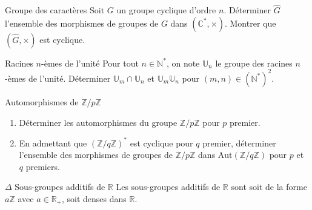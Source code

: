 \documentclass[french,a4paper]{article}
\newcommand{\N}{\mathbb{N}}
\newcommand{\Z}{\mathbb{Z}}
\newcommand{\R}{\mathbb{R}}
\newcommand{\C}{\mathbb{C}}
\newcommand{\U}{\mathbb{U}}
\newcommand{\st}{^*}
\theoremstyle{plain}
\theoremstyle{definition}
\theoremstyle{remark}
\begin{document}
\begin{ex}[Moulin.AG.06]{Groupe des caractères}
	Soit $G$ un groupe cyclique d'ordre $n$. Déterminer $\hat{G}$ l'ensemble des morphismes de groupes de $G$ dans $(\C\st,\times)$. Montrer que $(\hat{G},\times)$ est cyclique.
\end{ex}

\begin{ex}[Moulin.AG.07]{Racines $n$-èmes de l'unité}
	Pour tout $n\in\N\st$, on note $\U_n$ le groupe des racines $n$-èmes de l'unité. Déterminer $\U_m\cap\U_n$ et $\U_m\U_n$ pour $(m,n)\in(\N\st)^2$.
\end{ex}

\begin{ex}[Moulin.AG.08]{Automorphismes de $\Z/p\Z$}
	\begin{enumerate}
		\item Déterminer les automorphismes du groupe $\Z/p\Z$ pour $p$ premier.
		\item En admettant que $(\Z/q\Z)\st$ est cyclique pour $q$ premier, déterminer l'ensemble des morphismes de groupes de $\Z/p\Z$ dans $\text{Aut}(\Z/q\Z)$ pour $p$ et $q$ premiers.
	\end{enumerate}
\end{ex}

\begin{ex}[Moulin.AG.09]{$\Delta$ Sous-groupes additifs de $\R$}
	Les sous-groupes additifs de $\R$ sont soit de la forme $a\Z$ avec $a\in\R_+$, soit denses dans $\R$.
\end{ex}
\end{document}
